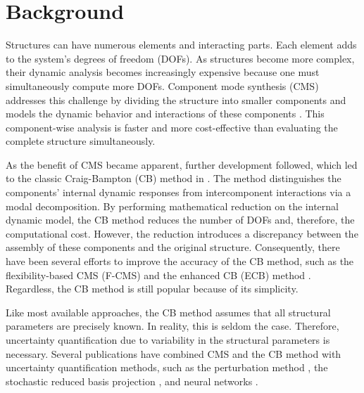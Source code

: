 %
%

\section{Background}
\label{sec: background}

Structures can have numerous elements and interacting parts.
Each element adds to the system's degrees of freedom (DOFs).
As structures become more complex, their dynamic analysis becomes increasingly expensive because one must simultaneously compute more DOFs.
Component mode synthesis (CMS) addresses this challenge by dividing the structure into smaller components and models the dynamic behavior and interactions of these components \cite{hurty1960vibrations}\cite{hurty1965dynamic}.
This component-wise analysis is faster and more cost-effective than evaluating the complete structure simultaneously.

As the benefit of CMS became apparent, further development followed, which led to the classic Craig-Bampton (CB) method in \cite{craig1968coupling}.
The method distinguishes the components' internal dynamic responses from intercomponent interactions via a modal decomposition.
By performing mathematical reduction on the internal dynamic model, the CB method reduces the number of DOFs and, therefore, the computational cost.
However, the reduction introduces a discrepancy between the assembly of these components and the original structure.
Consequently, there have been several efforts to improve the accuracy of the CB method, such as the flexibility-based CMS (F-CMS) \cite{park2004partitioned} and the enhanced CB (ECB) method \cite{kim2015enhanced}\cite{boo2018towards}.
Regardless, the CB method is still popular because of its simplicity.

Like most available approaches, the CB method assumes that all structural parameters are precisely known.
In reality, this is seldom the case.
Therefore, uncertainty quantification due to variability in the structural parameters is necessary.
Several publications have combined CMS and the CB method with uncertainty quantification methods, such as the perturbation method \cite{hinke2009component}\cite{sarsri2016dynamic}, the stochastic reduced basis projection \cite{dohnal2009joint}, and neural networks \cite{chatterjee2021multilevel}.

